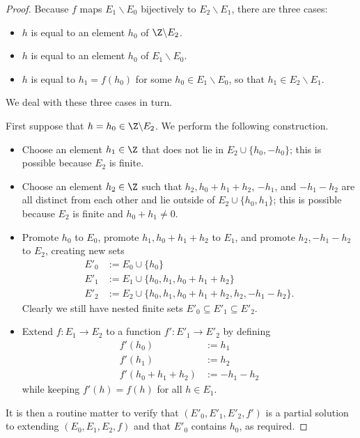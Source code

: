 \begin{proof}  Because $f$ maps $E_1 \backslash E_0$ bijectively to $E_2 \backslash E_1$, there are three cases:
\begin{itemize}
  \item $h$ is equal to an element $h_0$ of $\Z \backslash E_2$.
  \item $h$ is equal to an element $h_0$ of $E_1 \backslash E_0$.
  \item $h$ is equal to $h_1 = f(h_0)$ for some $h_0 \in E_1 \backslash E_0$, so that $h_1 \in E_2 \backslash E_1$.
\end{itemize}

We deal with these three cases in turn.

First suppose that $h = h_0\in \Z \backslash E_2$.  We perform the following construction.

\begin{itemize}
  \item Choose an element $h_1 \in \Z$ that does not lie in $E_2 \cup \{h_0, -h_0\}$; this is possible because $E_2$ is finite.
  \item Choose an element $h_2 \in \Z$ such that $h_2, h_0+h_1+h_2$, $-h_1$, and $-h_1-h_2$ are all distinct from each other and lie outside of $E_2 \cup \{h_0, h_1\}$; this is possible because $E_2$ is finite and $h_0+h_1 \neq 0$.
  \item Promote $h_0$ to $E_0$, promote $h_1, h_0+h_1+h_2$ to $E_1$, and promote $h_2, -h_1-h_2$ to $E_2$, creating new sets
  \begin{align*}
    E'_0 &:= E_0 \cup \{h_0\} \\
    E'_1 &:= E_1 \cup \{h_0, h_1, h_0+h_1+h_2\} \\
    E'_2 &:= E_2 \cup \{h_0, h_1, h_0+h_1+h_2, h_2, -h_1-h_2\}.
  \end{align*}
  Clearly we still have nested finite sets $E'_0 \subseteq E'_1 \subseteq E'_2$.
  \item Extend $f : E_1 \to E_2$ to a function $f': E'_1 \to E'_2$ by defining
  \begin{align*}
    f'(h_0) &:= h_1 \\
    f'(h_1) &:= h_2 \\
    f'(h_0+h_1+h_2) &:= -h_1-h_2
  \end{align*}
  while keeping $f'(h)=f(h)$ for all $h \in E_1$.
\end{itemize}
It is then a routine matter to verify that $(E'_0,E'_1,E'_2,f')$ is a partial solution to  extending $(E_0,E_1,E_2,f)$ and that $E'_0$ contains $h_0$, as required.


\end{proof}
